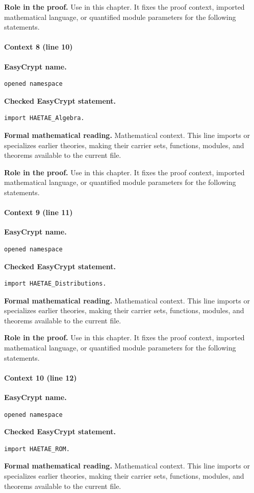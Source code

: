 \noindent\textbf{Role in the proof.}
Use in this chapter. It fixes the proof context, imported mathematical language, or quantified module parameters for the following statements.

\paragraph{Context 8 (line 10)}
\noindent\textbf{EasyCrypt name.}
\begin{lstlisting}[language=EasyCrypt,basicstyle=\ttfamily\scriptsize]
opened namespace
\end{lstlisting}
\noindent\textbf{Checked EasyCrypt statement.}
\begin{lstlisting}[language=EasyCrypt,basicstyle=\ttfamily\scriptsize]
import HAETAE_Algebra.
\end{lstlisting}
\noindent\textbf{Formal mathematical reading.}
Mathematical context. This line imports or specializes earlier theories, making their carrier sets, functions, modules, and theorems available to the current file.

\noindent\textbf{Role in the proof.}
Use in this chapter. It fixes the proof context, imported mathematical language, or quantified module parameters for the following statements.

\paragraph{Context 9 (line 11)}
\noindent\textbf{EasyCrypt name.}
\begin{lstlisting}[language=EasyCrypt,basicstyle=\ttfamily\scriptsize]
opened namespace
\end{lstlisting}
\noindent\textbf{Checked EasyCrypt statement.}
\begin{lstlisting}[language=EasyCrypt,basicstyle=\ttfamily\scriptsize]
import HAETAE_Distributions.
\end{lstlisting}
\noindent\textbf{Formal mathematical reading.}
Mathematical context. This line imports or specializes earlier theories, making their carrier sets, functions, modules, and theorems available to the current file.

\noindent\textbf{Role in the proof.}
Use in this chapter. It fixes the proof context, imported mathematical language, or quantified module parameters for the following statements.

\paragraph{Context 10 (line 12)}
\noindent\textbf{EasyCrypt name.}
\begin{lstlisting}[language=EasyCrypt,basicstyle=\ttfamily\scriptsize]
opened namespace
\end{lstlisting}
\noindent\textbf{Checked EasyCrypt statement.}
\begin{lstlisting}[language=EasyCrypt,basicstyle=\ttfamily\scriptsize]
import HAETAE_ROM.
\end{lstlisting}
\noindent\textbf{Formal mathematical reading.}
Mathematical context. This line imports or specializes earlier theories, making their carrier sets, functions, modules, and theorems available to the current file.

